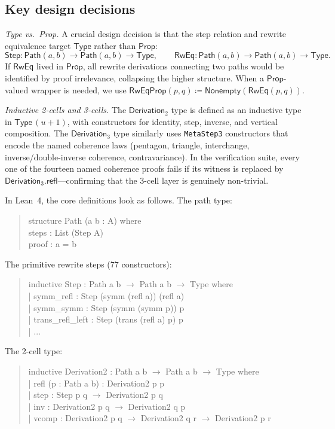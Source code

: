 \documentclass[manuscript]{BSLstyle}
\newcommand{\Path}{\mathsf{Path}}
\newcommand{\Type}{\mathsf{Type}}
\newcommand{\Prop}{\mathsf{Prop}}
\newcommand{\Step}{\mathsf{Step}}
\newcommand{\RwEq}{\mathsf{RwEq}}
\newcommand{\defeq}{\coloneqq}
\begin{document}
\subsection{Key design decisions}

\emph{Type vs.\ Prop.}
A crucial design decision is that the step relation and rewrite
equivalence target $\Type$ rather than $\Prop$:
\[
\Step : \Path(a, b) \to \Path(a, b) \to \Type,
\qquad
\RwEq : \Path(a, b) \to \Path(a, b) \to \Type.
\]
If $\RwEq$ lived in $\Prop$, all rewrite derivations connecting two
paths would be identified by proof irrelevance, collapsing the higher
structure.  When a $\Prop$-valued wrapper is needed, we use
$\mathsf{RwEqProp}(p, q) \defeq \mathsf{Nonempty}(\RwEq(p, q))$.

\emph{Inductive 2-cells and 3-cells.}
The $\mathsf{Derivation}_2$ type is defined as an inductive type in
$\Type\,(u+1)$, with constructors for identity, step, inverse, and
vertical composition.  The $\mathsf{Derivation}_3$ type similarly uses
\texttt{MetaStep3} constructors that encode the named coherence laws
(pentagon, triangle, interchange, inverse/double-inverse coherence,
contravariance).  In the verification suite, every one of the fourteen
named coherence proofs fails if its witness is replaced by
$\mathsf{Derivation}_3.\mathsf{refl}$---confirming that the 3-cell layer
is genuinely non-trivial.

In Lean~4, the core definitions look as follows.  The path type:
\begin{quote}
\small\ttfamily
structure Path (a b : A) where\\
\quad steps : List (Step A)\\
\quad proof : a = b
\end{quote}
The primitive rewrite steps (77 constructors):
\begin{quote}
\small\ttfamily
inductive Step : Path a b $\to$ Path a b $\to$ Type where\\
\quad | symm\_refl : Step (symm (refl a)) (refl a)\\
\quad | symm\_symm : Step (symm (symm p)) p\\
\quad | trans\_refl\_left : Step (trans (refl a) p) p\\
\quad | ...
\end{quote}
The 2-cell type:
\begin{quote}
\small\ttfamily
inductive Derivation2 : Path a b $\to$ Path a b $\to$ Type where\\
\quad | refl (p : Path a b) : Derivation2 p p\\
\quad | step : Step p q $\to$ Derivation2 p q\\
\quad | inv : Derivation2 p q $\to$ Derivation2 q p\\
\quad | vcomp : Derivation2 p q $\to$ Derivation2 q r $\to$ Derivation2 p r
\end{quote}
\end{document}
